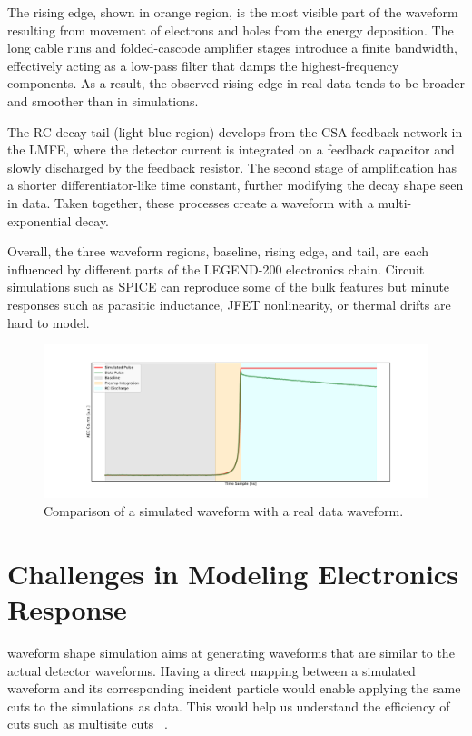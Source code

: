 The rising edge, shown in orange region, is the most visible part of the waveform resulting from movement of electrons and holes from the energy deposition. The long cable runs and folded-cascode amplifier stages introduce a finite bandwidth, effectively acting as a low-pass filter that damps the highest-frequency components. As a result, the observed rising edge in real data tends to be broader and smoother than in simulations. 

The RC decay tail (light blue region) develops from the CSA feedback network in the LMFE, where the detector current is integrated on a feedback capacitor and slowly discharged by the feedback resistor. The second stage of amplification has a shorter differentiator-like time constant, further modifying the decay shape seen in data. Taken together, these processes create a waveform with a multi-exponential decay. 


Overall, the three waveform regions, baseline, rising edge, and tail, are each influenced by different parts of the LEGEND-200 electronics chain. Circuit simulations such as SPICE can reproduce some of the bulk features but minute responses such as parasitic inductance, JFET nonlinearity, or thermal drifts are hard to model.

\begin{figure}[!htb]%
    \includegraphics[width=\linewidth,trim={4cm 0pc 3.5cm 0pc},clip]{ch6/figs/wf_comp_sim_data.pdf}
    \caption{Comparison of a simulated waveform with a real data waveform.}
    \label{fig:sim_data_comp}
\end{figure}

\section{Challenges in Modeling Electronics Response}

waveform shape simulation aims at generating waveforms that are similar to the actual detector waveforms. Having a direct mapping between a simulated waveform and its corresponding incident particle would enable applying the same cuts to the simulations as data. This would help us understand the efficiency of cuts such as multisite cuts ~\cite{AvsE}.  


